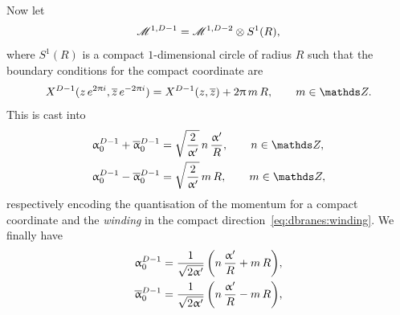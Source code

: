 Now let
\begin{equation}
  \mathscr{M}^{1, D - 1} = \mathscr{M}^{1, D - 2} \otimes S^1( R ),
  \label{eq:tduality:compactification}
\end{equation}
where $S^1( R )$ is a compact $1$-dimensional circle of radius $R$ such that the boundary conditions for the compact coordinate are
\begin{equation}
  X^{D - 1}( z\, e^{2\pi i}, \barz\, e^{-2\pi i} )
  =
  X^{D - 1}( z, \barz ) + 2 \pi\, m\, R,
  \qquad
  m \in \Z.
  \label{eq:dbranes:winding}
\end{equation}
This is cast into
\begin{equation}
  \begin{split}
    \alpha_0^{D-1} + \balpha_0^{D-1} & = \sqrt{\frac{2}{\ap}}\, n\, \frac{\ap}{R},
    \qquad
    n \in \Z,
    \\
    \alpha_0^{D-1} - \balpha_0^{D-1} & = \sqrt{\frac{2}{\ap}}\, m\, R,
    \qquad
    m \in \Z,
  \end{split}
\end{equation}
respectively encoding the quantisation of the momentum for a compact coordinate and the \emph{winding} in the compact direction~\eqref{eq:dbranes:winding}.
We finally have
\begin{equation}
  \begin{split}
    \upalpha_0^{D-1} &= \frac{1}{\sqrt{2 \upalpha'}}\, \qty( n\, \frac{\upalpha'}{R} + m\, R ),
    \\
    \overline{\upalpha}_0^{D-1} &= \frac{1}{\sqrt{2 \upalpha'}}\, \qty( n\, \frac{\upalpha'}{R} - m\, R ),
  \end{split}
\end{equation}

